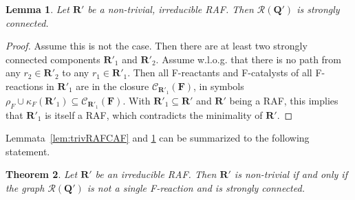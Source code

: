 \documentclass[pdflatex]{sn-jnl}
\theoremstyle{thmstyleone}%
\newtheorem{theorem}{Theorem}%
\newtheorem{lemma}[theorem]{Lemma}%
\theoremstyle{examplesty}%
\theoremstyle{thmstylethree}%
\newcommand{\queen}{\mathbf{Q}}
\newcommand{\food}{\ensuremath{\mathbf{F}}}
\newcommand{\closure}[2]{\mathscr{C}_{#1}(#2)}
\newcommand{\RGraph}[0]{\mathcal{R}}
\newcommand{\RAF}[0]{\mathbf{R}'}
\newcommand{\cat}{\kappa_F}
\newcommand{\feducts}{\rho_F}
\begin{document}
\vspace{6pt}
\begin{lemma}\label{lem:RGQSC}
  Let $\RAF$ be a non-trivial, irreducible RAF. Then $\RGraph(\queen')$ is
  strongly connected.
\end{lemma}
\begin{proof}
  Assume this is not the case. Then there are at least two strongly
  connected components $\RAF_1$ and $\RAF_2$. Assume w.l.o.g. that there is
  no path from any $r_2\in \RAF_2$ to any $r_1\in \RAF_1$. Then all
  F-reactants and F-catalysts of all F-reactions in $\RAF_1$ are in the
  closure $\closure{\RAF_1}{\food}$, in symbols $\feducts\cup
  \cat(\RAF_1)\subseteq \closure{\RAF_1}{\food}$. With $\RAF_1\subseteq
  \RAF$ and $\RAF$ being a RAF, this implies that $\RAF_1$ is itself a
  RAF, which contradicts the minimality of $\RAF$.
\end{proof}
\vspace{6pt}
Lemmata~\ref{lem:trivRAFCAF} and \ref{lem:RGQSC} can be
summarized to the following statement.
\vspace{6pt}
\begin{theorem}\label{thm:RAFStrCon}
  Let $\RAF$ be an irreducible RAF. Then $\RAF$ is non-trivial if and only
  if the graph $\RGraph(\queen')$ is not a single F-reaction and is
  strongly connected.
\end{theorem}
\vspace{6pt}
\end{document}
